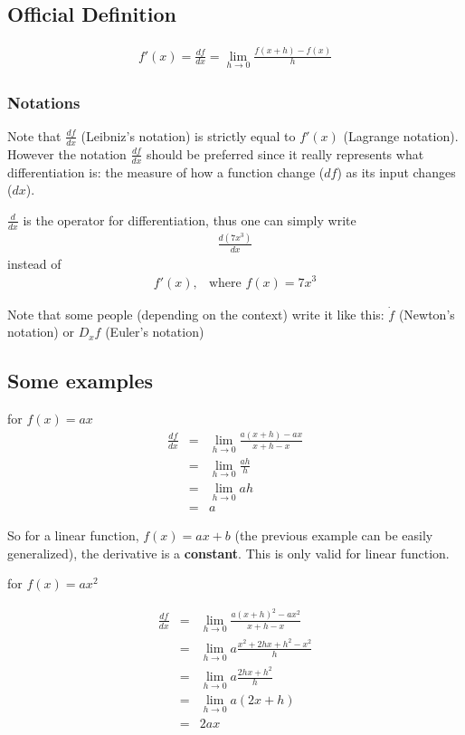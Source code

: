 \documentclass[a4paper] {scrartcl}%
\begin{document}
\subsection{Official Definition}
\begin{eqnarray}
	f'(x)=\frac{df}{dx}=\lim_{h\rightarrow0}\frac{f(x+h)-f(x)}{h}
\end{eqnarray}

\subsubsection{Notations}
Note that $\frac{df}{dx}$ (Leibniz's notation) is strictly equal to $f'(x)$ (Lagrange notation). However the notation $\frac{df}{dx}$ should be preferred since it really represents what differentiation is: the measure of how a function change ($df$) as its input changes ($dx$).

$\frac{d}{dx}$ is the operator for differentiation, thus one can simply write
\begin{eqnarray*}
	\frac{d(7x^3)}{dx}
\end{eqnarray*} 
instead of
\begin{eqnarray*}
	f'(x), &\text{where } f(x)=7x^3
\end{eqnarray*} 

Note that some people (depending on the context) write it like this: $\dot f$ (Newton's notation) or $D_x f$ (Euler's notation)

\subsection{Some examples}
for $f(x)=ax$
\begin{eqnarray*}
	\frac{df}{dx}
	&=&\lim_{h\rightarrow0}\frac{a(x+h)-ax}{x+h-x}\\
	&=&\lim_{h\rightarrow0}\frac{ah}{h}\\
	&=&\lim_{h\rightarrow0}ah\\
	&=&a
\end{eqnarray*}

So for a linear function, $f(x)=ax+b$ (the previous example can be easily generalized), the derivative is a \textbf{constant}. This is only valid for linear function.

for $f(x)=ax^2$

\begin{eqnarray*}
	\frac{df}{dx}
	&=&\lim_{h\rightarrow0}\frac{a(x+h)^2-ax^2}{x+h-x}\\
	&=&\lim_{h\rightarrow0}a\frac{x^2+2hx+h^2-x^2}{h}\\
	&=&\lim_{h\rightarrow0}a\frac{2hx+h^2}{h}\\
	&=&\lim_{h\rightarrow0}a(2x+h)\\
	&=&2ax
\end{eqnarray*}
\end{document}
